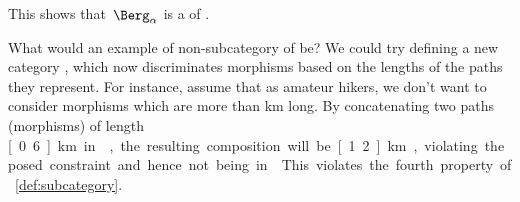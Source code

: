 This shows that~$\Berg_\alpha$ is a  of \Berg.

What would an example of non-subcategory of \Berg be?
We could try defining a new category \Berglazy, which now discriminates morphisms based on the lengths of the paths they represent.
For instance, assume that as amateur hikers, we don't want to consider morphisms which are more than \unit[1]{km} long.
By concatenating two paths (morphisms) of length \unit[0.6]{km} in \Berglazy, the resulting composition will be \unit[1.2]{km}, violating the posed constraint and hence not being in \Berglazy.
This violates the fourth property of \cref{def:subcategory}.










